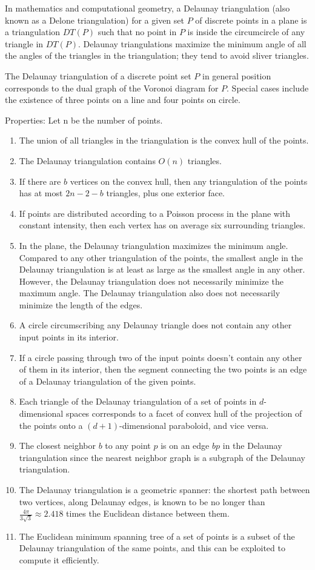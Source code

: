 In mathematics and computational geometry, a Delaunay triangulation (also known as a Delone triangulation) for a given set $P$ of discrete points in a plane is a triangulation $DT(P)$ such that no point in $P$ is inside the circumcircle of any triangle in $DT(P)$. Delaunay triangulations maximize the minimum angle of all the angles of the triangles in the triangulation; they tend to avoid sliver triangles.

The Delaunay triangulation of a discrete point set $P$ in general position corresponds to the dual graph of the Voronoi diagram for $P$. Special cases include the existence of three points on a line and four points on circle.

Properties: Let n be the number of points.
\begin{enumerate}
\item The union of all triangles in the triangulation is the convex hull of the points.
\item The Delaunay triangulation contains $O(n)$ triangles.
\item If there are $b$ vertices on the convex hull, then any triangulation of the points has at most $2n-2-b$ triangles, plus one exterior face.
\item If points are distributed according to a Poisson process in the plane with constant intensity, then each vertex has on average six surrounding triangles.
\item In the plane, the Delaunay triangulation maximizes the minimum angle. Compared to any other triangulation of the points, the smallest angle in the Delaunay triangulation is at least as large as the smallest angle in any other. However, the Delaunay triangulation does not necessarily minimize the maximum angle. The Delaunay triangulation also does not necessarily minimize the length of the edges.
\item A circle circumscribing any Delaunay triangle does not contain any other input points in its interior.
\item If a circle passing through two of the input points doesn't contain any other of them in its interior, then the segment connecting the two points is an edge of a Delaunay triangulation of the given points.
\item Each triangle of the Delaunay triangulation of a set of points in $d$-dimensional spaces corresponds to a facet of convex hull of the projection of the points onto a $(d+1)$-dimensional paraboloid, and vice versa.
\item The closest neighbor $b$ to any point $p$ is on an edge $bp$ in the Delaunay triangulation since the nearest neighbor graph is a subgraph of the Delaunay triangulation.
\item The Delaunay triangulation is a geometric spanner: the shortest path between two vertices, along Delaunay edges, is known to be no longer than ${\frac {4\pi }{3{\sqrt {3}}}}\approx 2.418$ times the Euclidean distance between them.
\item The Euclidean minimum spanning tree of a set of points is a subset of the Delaunay triangulation of the same points, and this can be exploited to compute it efficiently.
\end{enumerate}

